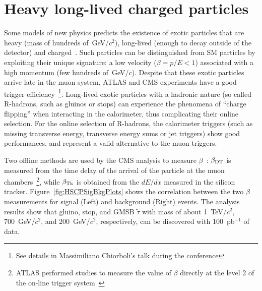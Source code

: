 \documentclass{cimento}
\begin{document}
\section{Heavy long-lived charged particles} \label{HSCP}
Some models of new physics predicts the existence 
of exotic particles that are heavy (mass of hundreds of~GeV/$c^2$), 
long-lived (enough to decay outside of the detector) and charged~\cite{Fairbairn:2006gg}. 
Such particles can be distinguished from SM particles
by exploiting their unique signature: a low velocity ($\beta=p/E<1$) 
associated with a high momentum (few hundreds of~GeV/$c$).
Despite that these exotic particles arrive late in the muon system, 
ATLAS and CMS experiments have a good trigger efficiency~\footnote{See details 
in Massimiliano Chiorboli's talk during the conference}.
Long-lived exotic particles with a hadronic nature 
(so called R-hadrons, such as gluinos or stops) 
can experience the phenomena of ``charge flipping'' when interacting 
in the calorimeter, thus complicating their online selection. 
For the online selection of R-hadrons, 
the calorimeter triggers (such as missing transverse energy, 
transverse energy sums or jet triggers) show good performances, 
and represent a valid alternative to the muon triggers.

Two offline methods are used by the 
CMS analysis to measure $\beta$~\cite{HSCP}:
$\beta_{{\rm DT}}$ is measured from the time delay of the arrival of the particle
at the muon chambers~\footnote{ATLAS performed studies to measure 
the value of $\beta$ directly at the level 2 of the on-line 
trigger system~\cite{Aad:2009wy}}, while $\beta_{{\rm Tk}}$ 
is obtained from the $dE/dx$ measured in the silicon tracker. 
Figure~\ref{fig:HSCPSigBkgPlots} shows the correlation between 
the two $\beta$ measurements for signal (Left) 
and background (Right) events. The analysis results show that 
gluino, stop, and GMSB $\tilde{\tau}$  with mass of about 
1~TeV/$c^2$, 700~GeV/$c^2$, and 200~GeV/$c^2$, 
respectively, can be discovered with 100~pb$^{-1}$ of data.
\end{document}
